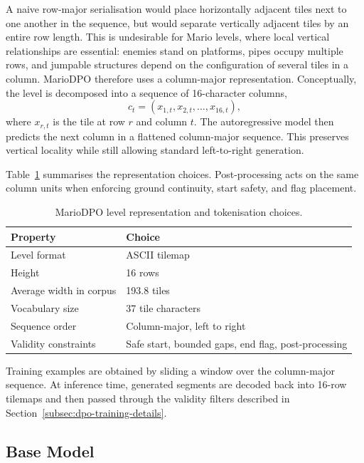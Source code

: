 \documentclass[shortabstract, mgr, english]{iithesis}
\begin{document}
A naive row-major serialisation would place horizontally adjacent tiles next to
one another in the sequence, but would separate vertically adjacent tiles by an
entire row length. This is undesirable for Mario levels, where local vertical
relationships are essential: enemies stand on platforms, pipes occupy multiple
rows, and jumpable structures depend on the configuration of several tiles in a
column. MarioDPO therefore uses a column-major representation. Conceptually, the
level is decomposed into a sequence of 16-character columns,
%
\begin{equation}
\label{eq:dpo-columns}
c_t = (x_{1,t}, x_{2,t}, \ldots, x_{16,t}),
\end{equation}
%
where $x_{r,t}$ is the tile at row $r$ and column $t$. The autoregressive model
then predicts the next column in a flattened column-major
sequence. This preserves vertical locality while still allowing standard
left-to-right generation.

Table~\ref{tab:dpo-representation} summarises the representation choices.
Post-processing acts on the same column units when enforcing ground
continuity, start safety, and flag placement.

\begin{table}[H]
\centering
\caption{MarioDPO level representation and tokenisation choices.}
\label{tab:dpo-representation}
\begin{tabular}{ll}
\toprule
\textbf{Property} & \textbf{Choice} \\
\midrule
Level format & ASCII tilemap \\
Height & 16 rows \\
Average width in corpus & 193.8 tiles \\
Vocabulary size & 37 tile characters \\
Sequence order & Column-major, left to right \\
Validity constraints & Safe start, bounded gaps, end flag, post-processing \\
\bottomrule
\end{tabular}
\end{table}

Training examples are obtained by sliding a window over the
column-major sequence. At inference time, generated
segments are decoded back into 16-row tilemaps and then passed through the
validity filters described in Section~\ref{subsec:dpo-training-details}.

\subsection[Base Model]{Base Model}
\label{subsec:dpo-sft}
\end{document}
